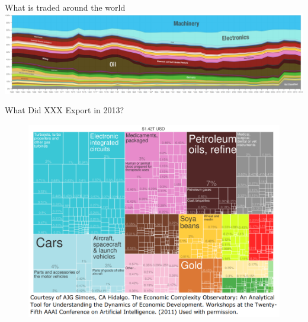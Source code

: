 \documentclass[10pt,hyperref={CJKbookmarks=true},xcolor=dvipsnames,aspectratio=169]{beamer}
\begin{document}
\begin{frame}{What is traded around the world}
\centering	\includegraphics[scale=0.24]{fig/gravity/OEC_Trade_Products}
\end{frame}

\begin{frame}{What Did XXX Export in 2013?}


\begin{figure}


\includegraphics[scale=0.35]{fig/gravity/com2-1.PNG}

\end{figure}

\end{frame}
\end{document}

